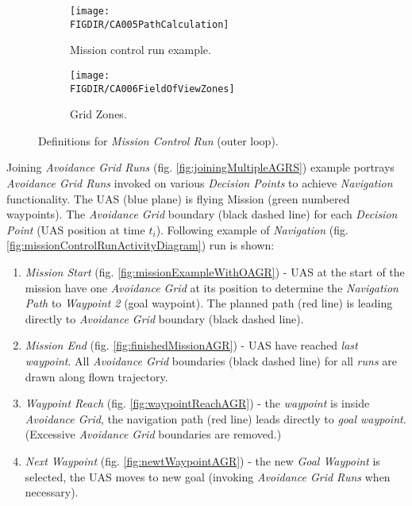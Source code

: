 \begin{figure}[H]
    \centering
    \begin{subfigure}{0.48\textwidth}
        \centering
        \texttt{[image: \\FIGDIR/CA005PathCalculation]}
        \caption{Mission control run example.}
        \label{fig:missionControlRunExample}
    \end{subfigure}
    \begin{subfigure}{0.48\textwidth}
    	\centering
        \texttt{[image: \\FIGDIR/CA006FieldOfViewZones]} 
        \caption{Grid Zones.}
        \label{fig:gridZonesMissionControl}
    \end{subfigure}
    \caption{Definitions for \emph{Mission Control Run} (outer loop).}
    \label{fig:definitionsForMissionControlRun}
\end{figure}

\noindent Joining \emph{Avoidance Grid Runs} (fig. \ref{fig:joiningMultipleAGRS})  example portrays \emph{Avoidance Grid Runs} invoked on various \emph{Decision Points} to achieve \emph{Navigation} functionality. The UAS (blue plane) is flying Mission (green numbered waypoints). The \emph{Avoidance Grid} boundary (black dashed line) for each \emph{Decision Point} (UAS position at time $t_i$). Following example of \emph{Navigation} (fig. \ref{fig:missionControlRunActivityDiagram}) run is shown:

\begin{enumerate}
    \item \emph{Mission Start} (fig. \ref{fig:missionExampleWithOAGR}) - UAS at the start of the mission have one \emph{Avoidance Grid} at its position to determine the \emph{Navigation Path} to \emph{Waypoint 2} (goal waypoint). The planned path (red line) is leading directly to \emph{Avoidance Grid} boundary (black dashed line).
    
    \item \emph{Mission End} (fig. \ref{fig:finishedMissionAGR}) - UAS have reached 
    \emph{last waypoint}. All \emph{Avoidance Grid} boundaries (black dashed line) for all \emph{runs} are drawn along flown trajectory. 
    
    \item \emph{Waypoint Reach} (fig. \ref{fig:waypointReachAGR}) - the \emph{waypoint} is inside \emph{Avoidance Grid}, the navigation path (red line) leads directly to \emph{goal waypoint}. (Excessive \emph{Avoidance Grid} boundaries are removed.)
    
    \item \emph{Next Waypoint} (fig. \ref{fig:newtWaypointAGR}) - the new \emph{Goal Waypoint} is selected, the UAS moves to new goal (invoking \emph{Avoidance Grid Runs} when necessary).
    
\end{enumerate}

